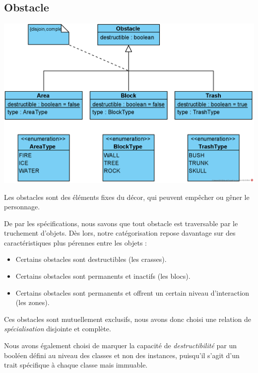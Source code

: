 \documentclass[oneside,a4paper]{book}
\begin{document}
\subsection{Obstacle}
\includegraphics[width=\textwidth,height=\textheight,keepaspectratio]{Diagrams/DJ-Obstacle.png}\newline

Les obstacles sont des éléments fixes du décor, qui peuvent empêcher ou gêner le personnage. \newline

De par les spécifications, nous savons que tout obstacle est traversable par le truchement d'objets. Dès lors, notre catégorisation repose davantage sur des caractéristiques plus pérennes entre les objets :
\begin{itemize}
    \item Certains obstacles sont destructibles (les crasses).
    \item Certains obstacles sont permanents et inactifs (les blocs).
    \item Certains obstacles sont permanents et offrent un certain niveau d'interaction (les zones).
\end{itemize}
Ces obstacles sont mutuellement exclusifs, nous avons donc choisi une relation de \textit{spécialisation} disjointe et complète.
\begin{tcolorbox}
    Nous avons également choisi de marquer la capacité de \textit{destructibilité} par un booléen défini au niveau des classes et non des instances, puisqu'il s'agit d'un trait spécifique à chaque classe mais immuable.
\end{tcolorbox}
\end{document}
